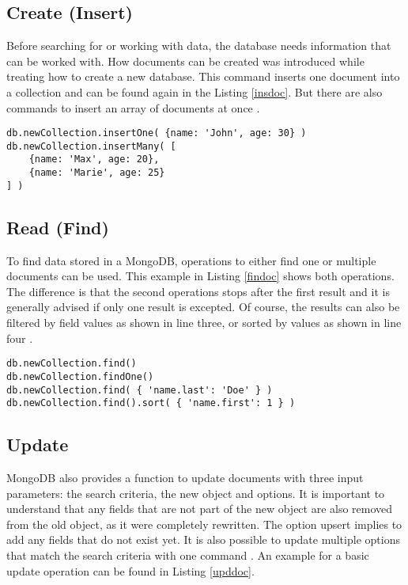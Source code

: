 \subsection{Create (Insert)}
Before searching for or working with data, the database needs information that can be worked with. How documents can be created was introduced while treating how to create a new database. This command inserts one document into a collection and can be found again in the Listing \ref{insdoc}. But there are also commands to insert an array of documents at once \cite{mdbbasics}.

\begin{lstlisting}[frame=single, caption=Create (Insert), label=insdoc]
db.newCollection.insertOne( {name: 'John', age: 30} )
db.newCollection.insertMany( [ 
    {name: 'Max', age: 20},
    {name: 'Marie', age: 25} 
] )
\end{lstlisting}

\subsection{Read (Find)}
To find data stored in a MongoDB, operations to either find one or multiple documents can be used. This example in Listing \ref{findoc} shows both operations. The difference is that the second operations stops after the first result and it is generally advised if only one result is excepted. Of course, the results can also be filtered by field values as shown in line three, or sorted by values as shown in line four \cite{mdbbasics}.

\begin{lstlisting}[frame=single, caption=Read (Find), label=findoc]
db.newCollection.find()
db.newCollection.findOne()
db.newCollection.find( { 'name.last': 'Doe' } )
db.newCollection.find().sort( { 'name.first': 1 } )
\end{lstlisting}

\subsection{Update}
MongoDB also provides a function to update documents with three input parameters: the search criteria, the new object and options. It is important to understand that any fields that are not part of the new object are also removed from the old object, as it were completely rewritten. The option upsert implies to add any fields that do not exist yet. It is also possible to update multiple options that match the search criteria with one command \cite{Banker2016}. An example for a basic update operation can be found in Listing \ref{upddoc}.

